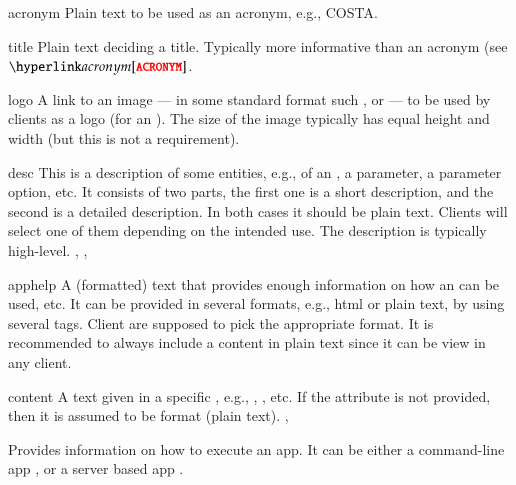 \bigskip
\xmlstruct
{acronym}
{
%
  Plain text to be used as an acronym, e.g., COSTA.
%
}
{}


\bigskip
\xmlstruct
{title}
{
%
  Plain text deciding a title. Typically more informative than an acronym (see 
  $\xmlstructref{acronym}$.
%
}
{}


\bigskip
\xmlstruct
{logo}
{
%
  A link to an image --- in some standard format such
  ,  or 
  --- to be used by clients as a logo (for an \app). The size of the
  image typically has equal height and width (but this is not a
  requirement).
%
}
{}


\bigskip
\xmlstruct
{desc}
{
%
  This is a description of some entities, e.g., of an \app, a
  parameter, a parameter option, etc. It consists of two parts, the
  first one is a short description, and the second is a detailed
  description. In both cases it should be plain text. Clients will
  select one of them depending on the intended use. The description is
  typically high-level.
%
}
{, , }


\bigskip
\xmlstruct
{apphelp}
{
%
  A (formatted) text that provides enough information on how an \app
  can be used, etc. It can be provided in several formats, e.g., html
  or plain text, by using several  tags. Client
  are supposed to pick the appropriate format. It is recommended to
  always include a content in plain text since it can be view in any
  client.
%
}
{}


\bigskip
\xmlstruct
{content}
{
%
  A text given in a specific , e.g.,
  , , etc. If the
  attribute  is not provided, then it is assumed
  to be  format (plain text).
%
}
{, }

\bigskip
{}
{
%
  Provides information on how to execute an app. It can be
  either a command-line app , or a
  server based app . 
%
}
{}

